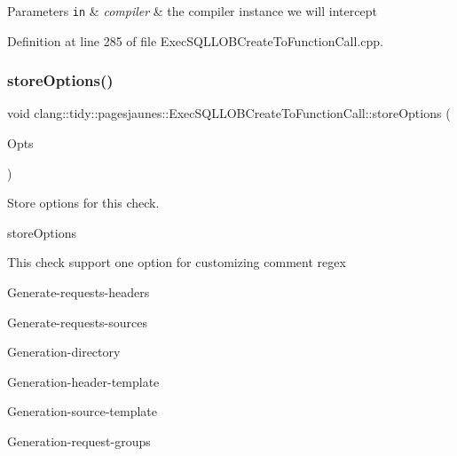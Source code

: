 \begin{DoxyParams}[1]{Parameters}
\mbox{\tt in}  & {\em compiler} & the compiler instance we will intercept \\
\hline
\end{DoxyParams}


Definition at line 285 of file Exec\+S\+Q\+L\+L\+O\+B\+Create\+To\+Function\+Call.\+cpp.

\mbox{\label{classclang_1_1tidy_1_1pagesjaunes_1_1_exec_s_q_l_l_o_b_create_to_function_call_a931fda30319276176bcb68f0c912dbac}} 
\subsubsection{\texorpdfstring{store\+Options()}{storeOptions()}}
{\footnotesize\ttfamily void clang\+::tidy\+::pagesjaunes\+::\+Exec\+S\+Q\+L\+L\+O\+B\+Create\+To\+Function\+Call\+::store\+Options (\begin{DoxyParamCaption}\item[{Clang\+Tidy\+Options\+::\+Option\+Map \&}]{Opts }\end{DoxyParamCaption})\hspace{0.3cm}{\ttfamily [override]}}



Store options for this check. 

store\+Options

This check support one option for customizing comment regex
\begin{DoxyItemize}
\item Generate-\/requests-\/headers
\item Generate-\/requests-\/sources
\item Generation-\/directory
\item Generation-\/header-\/template
\item Generation-\/source-\/template
\item Generation-\/request-\/groups
\end{DoxyItemize}



